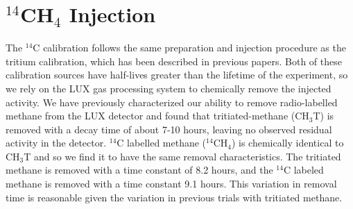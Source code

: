 \section{$^{14}$CH$_4$ Injection}\label{sec:c14inj}
The $^{14}$C calibration follows the same preparation and injection procedure as the tritium calibration, which has been described in previous papers\cite{lux_tritium,richard,attila}. Both of these calibration sources have half-lives greater than the lifetime of the experiment, so we rely on the LUX gas processing system to chemically remove the injected activity. We have previously characterized our ability to remove radio-labelled methane from the LUX detector and found that tritiated-methane (CH$_3$T) is removed with a decay time of about 7-10 hours, leaving no observed residual activity in the detector. $^{14}$C labelled methane ($^{14}$CH$_4$) is chemically identical to CH$_3$T and so we find it to have the same removal characteristics. The tritiated methane is removed with a time constant of 8.2 hours, and the $^{14}$C labeled methane is removed with a time constant 9.1 hours. This variation in removal time is reasonable given the variation in previous trials with tritiated methane.
